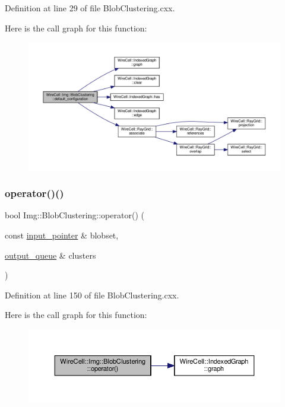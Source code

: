 Definition at line 29 of file Blob\+Clustering.\+cxx.

Here is the call graph for this function\+:
\nopagebreak
\begin{figure}[H]
\begin{center}
\leavevmode
\includegraphics[width=350pt]{class_wire_cell_1_1_img_1_1_blob_clustering_a9833b4248ce1a3b6564d42b6d256877b_cgraph}
\end{center}
\end{figure}
\mbox{\label{class_wire_cell_1_1_img_1_1_blob_clustering_ad2438afe5fd058260e8301690ae5731f}} 
\subsubsection{\texorpdfstring{operator()()}{operator()()}}
{\footnotesize\ttfamily bool Img\+::\+Blob\+Clustering\+::operator() (\begin{DoxyParamCaption}\item[{const \hyperlink{class_wire_cell_1_1_i_queuedout_node_acf5f716a764553f3c7055a9cf67e906e}{input\+\_\+pointer} \&}]{blobset,  }\item[{\hyperlink{class_wire_cell_1_1_i_queuedout_node_a39018e4e3dd886befac9636ac791a685}{output\+\_\+queue} \&}]{clusters }\end{DoxyParamCaption})\hspace{0.3cm}{\ttfamily [virtual]}}



Definition at line 150 of file Blob\+Clustering.\+cxx.

Here is the call graph for this function\+:
\nopagebreak
\begin{figure}[H]
\begin{center}
\leavevmode
\includegraphics[width=350pt]{class_wire_cell_1_1_img_1_1_blob_clustering_ad2438afe5fd058260e8301690ae5731f_cgraph}
\end{center}
\end{figure}


